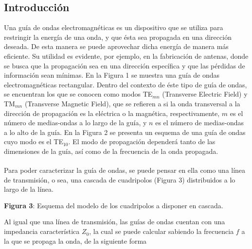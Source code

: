 \documentclass[11pt,a4paper]{article}
\begin{document}
\begin{multicols}{2}
\section{Introducción}
Una guía de ondas electromagnéticas es un dispositivo que se utiliza para restringir la energía de una onda, y que ésta sea propagada en una dirección deseada. De esta manera se puede aprovechar dicha energía de manera más eficiente. Su utilidad es evidente, por ejemplo, en la fabricación de antenas, donde se busca que la propagación sea en una dirección específica y que las pérdidas de información sean mínimas. En la Figura 1 se muestra una guía de ondas electromagnéticas rectangular.
Dentro del contexto de éste tipo de guía de ondas, se encuentran los que se conocen como modos TE$_{mn}$ (Transverse Electric Field) y TM$_{mn}$ (Transverse Magnetic Field), que se refieren a si la onda transversal a la dirección de propagación es la eléctrica o la magnética, respectivamente, $m$ es el número de medias-ondas a lo largo de la guía, y $n$ es el número de medias-ondas a lo alto de la guía. En la Figura 2 se presenta un esquema de una guía de ondas cuyo modo es el TE$_{10}$.
El modo de propagación dependerá tanto de las dimensiones de la guía, así como de la frecuencia de la onda propagada. \\ \\
Para poder caracterizar la guía de ondas, se puede pensar en ella como una línea de transmisión, o sea, una cascada de cuadripolos (Figura 3) distribuidos a lo largo de la línea.
\begin{center}
\textbf{Figura 3}: Esquema del modelo de los cuadripolos a disponer en cascada.
\end{center}
Al igual que una línea de transmisión, las guías de ondas cuentan con una impedancia característica $Z_0$, la cual se puede calcular sabiendo la frecuencia $f$ a la que se propaga la onda, de la siguiente forma


\end{multicols}
\end{document}
